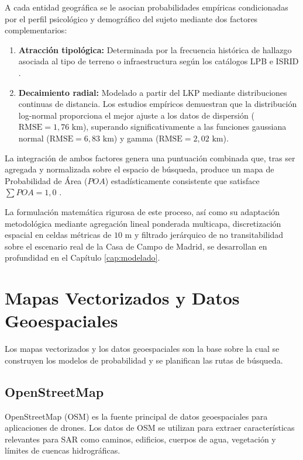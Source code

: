 A cada entidad geográfica se le asocian probabilidades empíricas condicionadas por el perfil psicológico y demográfico del sujeto mediante dos factores complementarios:
\begin{enumerate}
	\item \textbf{Atracción tipológica:} Determinada por la frecuencia histórica de hallazgo asociada al tipo de terreno o infraestructura según los catálogos LPB e ISRID \cite{koester2008lost, romero2018manual}.
	\item \textbf{Decaimiento radial:} Modelado a partir del LKP mediante distribuciones continuas de distancia. Los estudios empíricos demuestran que la distribución log-normal proporciona el mejor ajuste a los datos de dispersión ($\text{RMSE} = 1{,}76\text{ km}$), superando significativamente a las funciones gaussiana normal ($\text{RMSE} = 6{,}83\text{ km}$) y gamma ($\text{RMSE} = 2{,}02\text{ km}$).
\end{enumerate}

La integración de ambos factores genera una puntuación combinada que, tras ser agregada y normalizada sobre el espacio de búsqueda, produce un mapa de Probabilidad de Área ($POA$) estadísticamente consistente que satisface $\sum POA = 1{,}0$ \cite{doherty2014}. 

La formulación matemática rigurosa de este proceso, así como su adaptación metodológica mediante agregación lineal ponderada multicapa, discretización espacial en celdas métricas de $10\text{ m}$ y filtrado jerárquico de no transitabilidad sobre el escenario real de la Casa de Campo de Madrid, se desarrollan en profundidad en el Capítulo \ref{cap:modelado}.

\section{Mapas Vectorizados y Datos Geoespaciales}

Los mapas vectorizados y los datos geoespaciales son la base sobre la cual se construyen los modelos de probabilidad y se planifican las rutas de búsqueda.

\subsection{OpenStreetMap}

OpenStreetMap (OSM) es la fuente principal de datos geoespaciales para aplicaciones de drones. Los datos de OSM se utilizan para extraer características relevantes para SAR como caminos, edificios, cuerpos de agua, vegetación y límites de cuencas hidrográficas.

